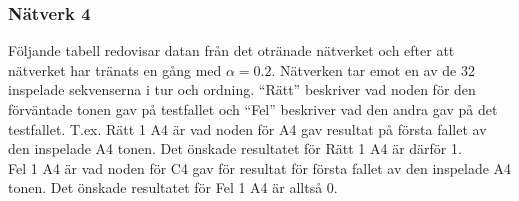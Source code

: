 \documentclass[a4paper,10pt]{article}
\begin{document}

\break
\subsubsection{Nätverk 4}

Följande tabell redovisar datan från det otränade nätverket och efter att nätverket har tränats en gång med $\alpha=0.2$. Nätverken tar emot en av de 32 inspelade sekvenserna i tur och ordning. ``Rätt'' beskriver vad noden för den förväntade tonen gav på testfallet och ``Fel'' beskriver vad den andra gav på det testfallet. T.ex. Rätt 1 A4 är vad noden för A4 gav resultat på första fallet av den inspelade A4 tonen. Det önskade resultatet för Rätt 1 A4 är därför 1. \\
Fel 1 A4 är vad noden för C4 gav för resultat för första fallet av den inspelade A4 tonen. Det önskade resultatet för Fel 1 A4 är alltså 0.\\
\end{document}
